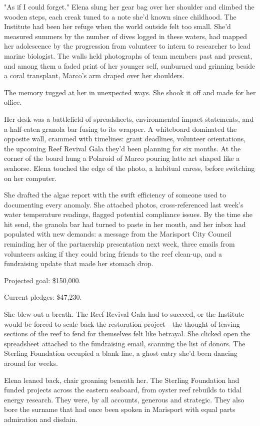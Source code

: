 "As if I could forget." Elena slung her gear bag over her shoulder and climbed the wooden steps, each creak tuned to a note she'd known since childhood. The Institute had been her refuge when the world outside felt too small. She'd measured summers by the number of dives logged in these waters, had mapped her adolescence by the progression from volunteer to intern to researcher to lead marine biologist. The walls held photographs of team members past and present, and among them a faded print of her younger self, sunburned and grinning beside a coral transplant, Marco's arm draped over her shoulders.

The memory tugged at her in unexpected ways. She shook it off and made for her office.

Her desk was a battlefield of spreadsheets, environmental impact statements, and a half-eaten granola bar fusing to its wrapper. A whiteboard dominated the opposite wall, crammed with timelines: grant deadlines, volunteer orientations, the upcoming Reef Revival Gala they'd been planning for six months. At the corner of the board hung a Polaroid of Marco pouring latte art shaped like a seahorse. Elena touched the edge of the photo, a habitual caress, before switching on her computer.

She drafted the algae report with the swift efficiency of someone used to documenting every anomaly. She attached photos, cross-referenced last week's water temperature readings, flagged potential compliance issues. By the time she hit send, the granola bar had turned to paste in her mouth, and her inbox had populated with new demands: a message from the Marisport City Council reminding her of the partnership presentation next week, three emails from volunteers asking if they could bring friends to the reef clean-up, and a fundraising update that made her stomach drop.

Projected goal: \$150,000.

Current pledges: \$47,230.

She blew out a breath. The Reef Revival Gala had to succeed, or the Institute would be forced to scale back the restoration project—the thought of leaving sections of the reef to fend for themselves felt like betrayal. She clicked open the spreadsheet attached to the fundraising email, scanning the list of donors. The Sterling Foundation occupied a blank line, a ghost entry she'd been dancing around for weeks.

Elena leaned back, chair groaning beneath her. The Sterling Foundation had funded projects across the eastern seaboard, from oyster reef rebuilds to tidal energy research. They were, by all accounts, generous and strategic. They also bore the surname that had once been spoken in Marisport with equal parts admiration and disdain.

